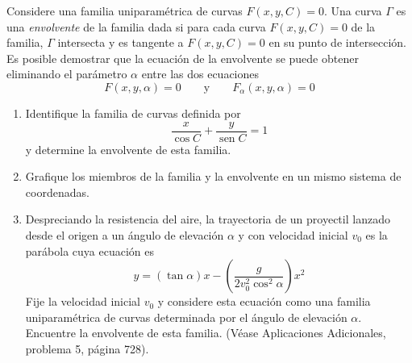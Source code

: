 \item Considere una familia uniparamétrica de curvas $F(x, y, C) = 0$. Una curva $\Gamma$ es una \textit{envolvente} de la familia dada si para cada curva $F(x, y, C) = 0$ de la familia, $\Gamma$ intersecta y es tangente a $F(x, y, C) = 0$ en su punto de intersección. Es posible demostrar que la ecuación de la envolvente se puede obtener eliminando el parámetro $\alpha$ entre las dos ecuaciones
    \[ F(x, y, \alpha) = 0 \qquad \text{y} \qquad F_\alpha(x, y, \alpha) = 0 \]
    \begin{enumerate}
        \item[(a)] Identifique la familia de curvas definida por
        \[ \frac{x}{\cos C} + \frac{y}{\operatorname{sen} C} = 1 \]
        y determine la envolvente de esta familia.
        \item[(b)] Grafique los miembros de la familia y la envolvente en un mismo sistema de coordenadas.
        \item[(c)] Despreciando la resistencia del aire, la trayectoria de un proyectil lanzado desde el origen a un ángulo de elevación $\alpha$ y con velocidad inicial $v_0$ es la parábola cuya ecuación es
        \[ y = (\tan \alpha)x - \left(\frac{g}{2v_0^2 \cos^2 \alpha}\right)x^2 \]
        Fije la velocidad inicial $v_0$ y considere esta ecuación como una familia uniparamétrica de curvas determinada por el ángulo de elevación $\alpha$. Encuentre la envolvente de esta familia. (Véase Aplicaciones Adicionales, problema 5, página 728).
    \end{enumerate}
